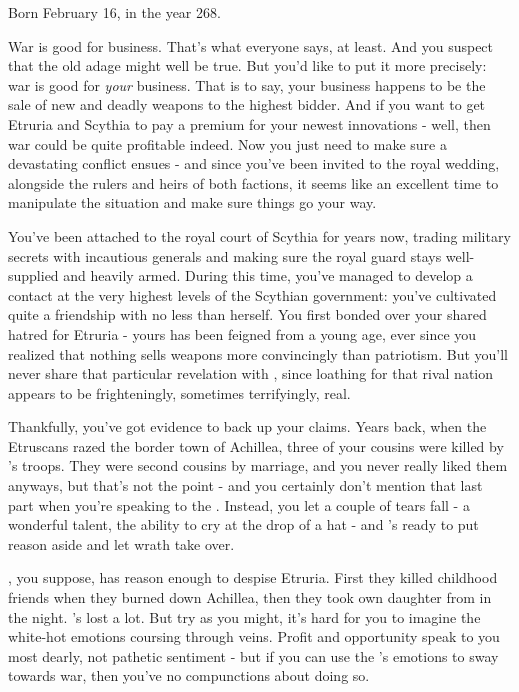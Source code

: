 \documentclass[char]{Kos}
\begin{document}
\name{\cArmsDealer{}}

Born February 16, in the year 268.

War is good for business. That's what everyone says, at least. And you suspect that the old adage might well be true. But you'd like to put it more precisely: war is good for \emph{your} business. That is to say, your business happens to be the sale of new and deadly weapons to the highest bidder. And if you want to get Etruria and Scythia to pay a premium for your newest innovations - well, then war could be quite profitable indeed. Now you just need to make sure a devastating conflict ensues - and since you've been invited to the royal wedding, alongside the rulers and heirs of both factions, it seems like an excellent time to manipulate the situation and make sure things go your way.

You've been attached to the royal court of Scythia for years now, trading military secrets with incautious generals and making sure the royal guard stays well-supplied and heavily armed. During this time, you've managed to develop a contact at the very highest levels of the Scythian government: you've cultivated quite a friendship with no less than \cScythiaQueen{\Monarch} \cScythiaQueen{} herself. You first bonded over your shared hatred for Etruria - yours has been feigned from a young age, ever since you realized that nothing sells weapons more convincingly than patriotism. But you'll never share that particular revelation with \cScythiaQueen{}, since \cScythiaQueen{\their} loathing for that rival nation appears to be frighteningly, sometimes terrifyingly, real.

Thankfully, you've got evidence to back up your claims. Years back, when the Etruscans razed the border town of Achillea, three of your cousins were killed by \cEtruriaKing{\Monarch} \cEtruriaKing{}'s troops. They were second cousins by marriage, and you never really liked them anyways, but that's not the point - and you certainly don't mention that last part when you're speaking to the \cScythiaQueen{\Monarch}. Instead, you let a couple of tears fall - a wonderful talent, the ability to cry at the drop of a hat - and \cScythiaQueen{}'s ready to put reason aside and let \cScythiaQueen{\their} wrath take over.

\cScythiaQueen{}, you suppose, has reason enough to despise Etruria. First they killed \cScythiaQueen{\their} childhood friends when they burned down Achillea, then they took \cScythiaQueen{\their} own daughter from \cScythiaQueen{\them} in the night. \cScythiaQueen{\They}'s lost a lot. But try as you might, it's hard for you to imagine the white-hot emotions coursing through \cScythiaQueen{\their} veins. Profit and opportunity speak to you most dearly, not pathetic sentiment - but if you can use the \cScythiaQueen{\Monarch}'s emotions to sway \cScythiaQueen{\them} towards war, then you've no compunctions about doing so.
\end{document}
